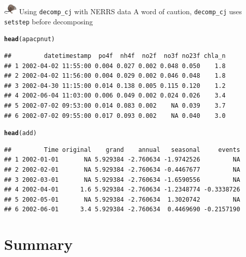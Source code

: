 \documentclass[xcolor=dvipsnames,serif]{beamer}\usepackage[]{graphicx}\usepackage[]{color}
\makeatletter
\newcommand{\hlstd}[1]{\textcolor[rgb]{0.345,0.345,0.345}{#1}}%
\newcommand{\hlkwd}[1]{\textcolor[rgb]{0.737,0.353,0.396}{\textbf{#1}}}%
\newenvironment{kframe}{%
 \def\at@end@of@kframe{}%
 \ifinner\ifhmode%
  \def\at@end@of@kframe{\end{minipage}}%
  \begin{minipage}{\columnwidth}%
 \fi\fi%
 \def\FrameCommand##1{\hskip\@totalleftmargin \hskip-\fboxsep
 \colorbox{shadecolor}{##1}\hskip-\fboxsep
     \hskip-\linewidth \hskip-\@totalleftmargin \hskip\columnwidth}%
 \MakeFramed {\advance\hsize-\width
   \@totalleftmargin\z@ \linewidth\hsize
   \@setminipage}}%
 {\par\unskip\endMakeFramed%
 \at@end@of@kframe}
\newenvironment{knitrout}{}{} %
\makeatother
\begin{document}
\begin{frame}[fragile]{\includegraphics[width = 0.05\textwidth]{imgs/swmprat.png} Using \texttt{decomp\_cj} with NERRS data}
A word of caution, \texttt{decomp\_cj} uses \texttt{setstep} before decomposing
\begin{knitrout}\scriptsize
{}\color{fgcolor}\begin{kframe}
\begin{alltt}
\hlkwd{head}\hlstd{(apacpnut)}
\end{alltt}
\begin{verbatim}
##         datetimestamp  po4f  nh4f  no2f  no3f no23f chla_n
## 1 2002-04-02 11:55:00 0.004 0.027 0.002 0.048 0.050    1.8
## 2 2002-04-02 11:56:00 0.004 0.029 0.002 0.046 0.048    1.8
## 3 2002-04-30 11:15:00 0.014 0.138 0.005 0.115 0.120    1.2
## 4 2002-06-04 11:03:00 0.006 0.049 0.002 0.024 0.026    3.4
## 5 2002-07-02 09:53:00 0.014 0.083 0.002    NA 0.039    3.7
## 6 2002-07-02 09:55:00 0.017 0.093 0.002    NA 0.040    3.0
\end{verbatim}
\begin{alltt}
\hlkwd{head}\hlstd{(add)}
\end{alltt}
\begin{verbatim}
##         Time original    grand    annual   seasonal     events
## 1 2002-01-01       NA 5.929384 -2.760634 -1.9742526         NA
## 2 2002-02-01       NA 5.929384 -2.760634 -0.4467677         NA
## 3 2002-03-01       NA 5.929384 -2.760634 -1.6590556         NA
## 4 2002-04-01      1.6 5.929384 -2.760634 -1.2348774 -0.3338726
## 5 2002-05-01       NA 5.929384 -2.760634  1.3020742         NA
## 6 2002-06-01      3.4 5.929384 -2.760634  0.4469690 -0.2157190
\end{verbatim}
\end{kframe}
\end{knitrout}
\end{frame}

\section{Summary}
\end{document}
